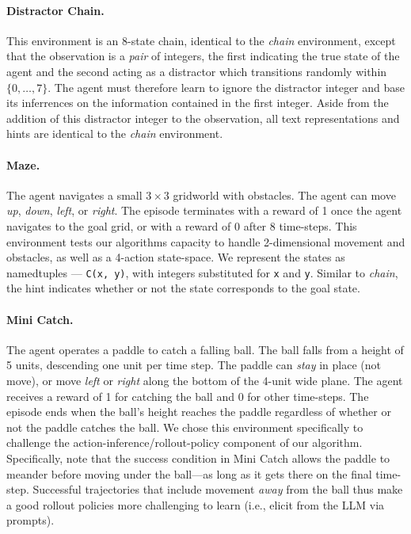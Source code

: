 \documentclass{article}
\begin{document}
\paragraph{Distractor Chain.} This environment is an 8-state chain, identical to
the \emph{chain} environment, except that the observation is a \emph{pair} of
integers, the first indicating the true state of the agent and the second acting
as a distractor which transitions randomly within $\{0, \dots, 7\}$. The agent
must therefore learn to ignore the distractor integer and base its inferrences
on the information contained in the first integer. Aside from the addition of
this distractor integer to the observation, all text representations and hints
are identical to the \emph{chain} environment.

\paragraph{Maze.} The agent navigates a small $3\times 3$ gridworld with
obstacles. The agent can move \emph{up}, \emph{down}, \emph{left}, or
\emph{right}. The episode terminates with a reward of 1 once the agent navigates
to the goal grid, or with a reward of 0 after 8 time-steps. This environment
tests our algorithms capacity to handle 2-dimensional movement and obstacles, as
well as a 4-action state-space. We represent the states as namedtuples ---
\texttt{C(x, y)}, with integers substituted for \texttt{x} and \texttt{y}.
Similar to \emph{chain}, the hint indicates whether or not the state corresponds
to the goal state.

\paragraph{Mini Catch.}
The agent operates a paddle to catch a falling ball. The ball falls from a
height of 5 units, descending one unit per time step. The paddle can \emph{stay}
in place (not move), or move \emph{left} or \emph{right} along the bottom of the
4-unit wide plane. The agent receives a reward of 1 for catching the ball and 0
for other time-steps. The episode ends when the ball's height reaches the paddle
regardless of whether or not the paddle catches the ball.
We chose this environment specifically to challenge the
action-inference/rollout-policy component of our algorithm. Specifically, note
that the success condition in Mini Catch allows the paddle to meander before
moving under the ball---as long as it gets there on the final time-step.
Successful trajectories that include movement \textit{away} from the ball thus
make a good rollout policies more challenging to learn (i.e., elicit from the
LLM via prompts).
\end{document}
